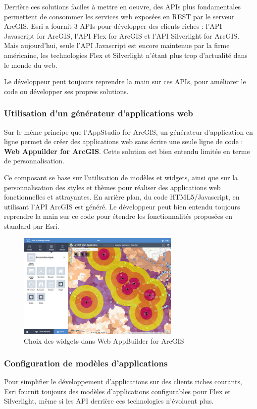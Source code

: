 \documentclass[11pt]{article}
\begin{document}
Derrière ces solutions faciles à mettre en oeuvre, des APIs plus fondamentales permettent de consommer les services web exposées en REST par le serveur ArcGIS. Esri a fournit 3 APIs pour développer des clients riches : l'API Javascript for ArcGIS, l'API Flex for ArcGIS et l'API Silverlight for ArcGIS. Mais aujourd'hui, seule l'API Javascript est encore maintenue par la firme américaine, les technologies Flex et Silverlight n'étant plus trop d'actualité dans le monde du web.

Le développeur peut toujours reprendre la main sur ces APIs, pour améliorer le code ou développer ses propres solutions.


\subsubsection{Utilisation d'un générateur d'applications web}
Sur le même principe que l'AppStudio for ArcGIS, un générateur d'application en ligne permet de créer des applications web sans écrire une seule ligne de code : \textbf{Web Appuilder for ArcGIS}. Cette solution est bien entendu limitée en terme de personnalisation.

Ce composant se base sur l'utilisation de modèles et widgets, ainsi que sur la personnalisation des styles et thèmes pour réaliser des applications web fonctionnelles et attrayantes. En arrière plan, du code HTML5/Javascript, en utilisant l'API ArcGIS est généré. Le développeur peut bien entendu toujours reprendre la main sur ce code pour étendre les fonctionnalités proposées en standard par Esri.

\begin{figure}[H]
	\center \includegraphics[width=0.70\textwidth]{img/cours/web_appbuilder.png}
	\caption{Choix des widgets dans Web AppBuilder for ArcGIS}
\end{figure}


\subsubsection{Configuration de modèles d'applications}
Pour simplifier le développement d'applications sur des clients riches courants, Esri fournit toujours des modèles d'applications configurables pour Flex et Silverlight, même si les API derrière ces technologies n'évoluent plus. 
\end{document}
